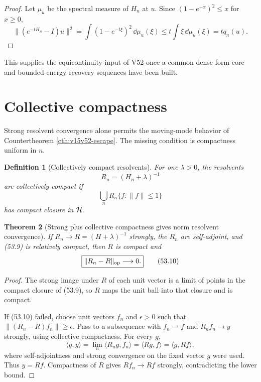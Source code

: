 \documentclass[11pt]{article}
\newtheorem{theorem}{Theorem}[section]
\newtheorem{definition}[theorem]{Definition}
\theoremstyle{remark}
\begin{document}
\begin{proof}
Let \(\mu_u\) be the spectral measure of \(H_n\) at \(u\).  Since
\((1-e^{-x})^2\leq x\) for \(x\geq0\),
\[
 \|(e^{-tH_n}-I)u\|^2
 =\int(1-e^{-t\xi})^2\,\dd\mu_u(\xi)
 \leq t\int\xi\,\dd\mu_u(\xi)
 =tq_n(u).
                                                               \tag{53.7}
\]
\end{proof}

This supplies the equicontinuity input of V52 once a common dense
form core and bounded-energy recovery sequences have been built.

\section{Collective compactness}

Strong resolvent convergence alone permits the moving-mode behavior
of Countertheorem \ref{cth:v15v52-escape}.  The missing condition is
compactness uniform in \(n\).

\begin{definition}[Collectively compact resolvents]
\label{def:v15v53-collective}
For one \(\lambda>0\), the resolvents
\[
 R_n=(H_n+\lambda)^{-1}                                 \tag{53.8}
\]
are collectively compact if
\[
 \bigcup_nR_n\{f:\|f\|\leq1\}                           \tag{53.9}
\]
has compact closure in \({\cal H}\).
\end{definition}

\begin{theorem}[Strong plus collective compactness gives norm
resolvent convergence]
\label{thm:v15v53-norm-resolvent}
If \(R_n\to R=(H+\lambda)^{-1}\) strongly, the \(R_n\) are
self-adjoint, and (53.9) is relatively compact, then \(R\) is
compact and
\[
 \boxed{\|R_n-R\|_{\rm op}\longrightarrow0.}            \tag{53.10}
\]
\end{theorem}

\begin{proof}
The strong image under \(R\) of each unit vector is a limit of
points in the compact closure of (53.9), so \(R\) maps the unit ball
into that closure and is compact.

If (53.10) failed, choose unit vectors \(f_n\) and \(\epsilon>0\)
such that
\(\|(R_n-R)f_n\|\geq\epsilon\).  Pass to a subsequence with
\(f_n\rightharpoonup f\) and \(R_nf_n\to y\) strongly, using
collective compactness.  For every \(g\),
\[
 \langle g,y\rangle
 =\lim_n\langle R_ng,f_n\rangle
 =\langle Rg,f\rangle
 =\langle g,Rf\rangle,                                  \tag{53.11}
\]
where self-adjointness and strong convergence on the fixed vector
\(g\) were used.  Thus \(y=Rf\).  Compactness of \(R\) gives
\(Rf_n\to Rf\) strongly, contradicting the lower bound.
\end{proof}
\end{document}
